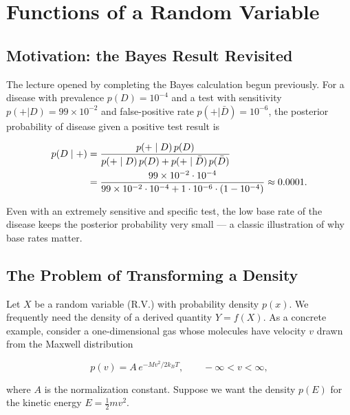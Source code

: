 
\section{Functions of a Random Variable}

\subsection{Motivation: the Bayes Result Revisited}

The lecture opened by completing the Bayes calculation begun previously. For a disease with prevalence $p(D)=10^{-4}$ and a test with sensitivity $p(+|D)=99\times 10^{-2}$ and false-positive rate $p(+|\bar{D})=10^{-6}$, the posterior probability of disease given a positive test result is

\begin{align}
  p(D\mid+) &= \frac{p(+\mid D)\,p(D)}{p(+\mid D)\,p(D)+p(+\mid\bar{D})\,p(\bar{D})} \notag \\
             &= \frac{99\times 10^{-2}\cdot 10^{-4}}
                     {99\times 10^{-2}\cdot 10^{-4}+1\cdot 10^{-6}\cdot(1-10^{-4})}
              \approx 0.0001.
\end{align}

Even with an extremely sensitive and specific test, the low base rate of the disease keeps the posterior probability very small — a classic illustration of why base rates matter.

\subsection{The Problem of Transforming a Density}

Let $X$ be a random variable (R.V.) with probability density $p(x)$. We frequently need the density of a derived quantity $Y = f(X)$. As a concrete example, consider a one-dimensional gas whose molecules have velocity $v$ drawn from the Maxwell distribution

\begin{equation}
  p(v) = A\,e^{-Mv^2/2k_BT}, \qquad -\infty < v < \infty,
\end{equation}

where $A$ is the normalization constant. Suppose we want the density $p(E)$ for the kinetic energy $E = \tfrac{1}{2}mv^2$.

